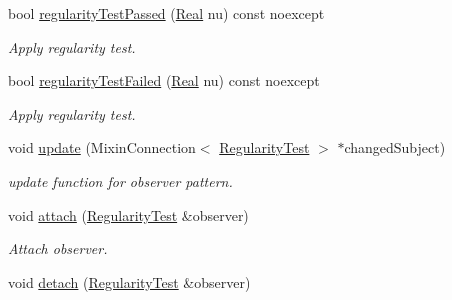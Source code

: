 \begin{DoxyCompactItemize}
\item 
bool \hyperlink{classSpacy_1_1Mixin_1_1RegularityTest_afe2fd3259850b874a85779d4f562e7f6}{regularity\+Test\+Passed} (\hyperlink{classSpacy_1_1Real}{Real} nu) const noexcept
\begin{DoxyCompactList}\small\item\em Apply regularity test. \end{DoxyCompactList}\item 
bool \hyperlink{classSpacy_1_1Mixin_1_1RegularityTest_a26217e26765bb6f938224ea76612c8c0}{regularity\+Test\+Failed} (\hyperlink{classSpacy_1_1Real}{Real} nu) const noexcept
\begin{DoxyCompactList}\small\item\em Apply regularity test. \end{DoxyCompactList}\item 
\hypertarget{classSpacy_1_1Mixin_1_1RegularityTest_ae3bfc55bec9fe3068adffb6d24b3b964}{}void \hyperlink{classSpacy_1_1Mixin_1_1RegularityTest_ae3bfc55bec9fe3068adffb6d24b3b964}{update} (Mixin\+Connection$<$ \hyperlink{classSpacy_1_1Mixin_1_1RegularityTest_ae2887fec9a5bdd42239b3df6750bf2e9}{Regularity\+Test} $>$ $\ast$changed\+Subject)\label{classSpacy_1_1Mixin_1_1RegularityTest_ae3bfc55bec9fe3068adffb6d24b3b964}

\begin{DoxyCompactList}\small\item\em update function for observer pattern. \end{DoxyCompactList}\item 
\hypertarget{classSpacy_1_1Mixin_1_1MixinConnection_abb5520ee6b22dd993d78f142939a1ed4}{}void \hyperlink{classSpacy_1_1Mixin_1_1MixinConnection_abb5520ee6b22dd993d78f142939a1ed4}{attach} (\hyperlink{classSpacy_1_1Mixin_1_1RegularityTest_ae2887fec9a5bdd42239b3df6750bf2e9}{Regularity\+Test} \&observer)\label{classSpacy_1_1Mixin_1_1MixinConnection_abb5520ee6b22dd993d78f142939a1ed4}

\begin{DoxyCompactList}\small\item\em Attach observer. \end{DoxyCompactList}\item 
\hypertarget{classSpacy_1_1Mixin_1_1MixinConnection_adda739590c487679c26f60e50aedb73f}{}void \hyperlink{classSpacy_1_1Mixin_1_1MixinConnection_adda739590c487679c26f60e50aedb73f}{detach} (\hyperlink{classSpacy_1_1Mixin_1_1RegularityTest_ae2887fec9a5bdd42239b3df6750bf2e9}{Regularity\+Test} \&observer)\label{classSpacy_1_1Mixin_1_1MixinConnection_adda739590c487679c26f60e50aedb73f}


\end{DoxyCompactItemize}
